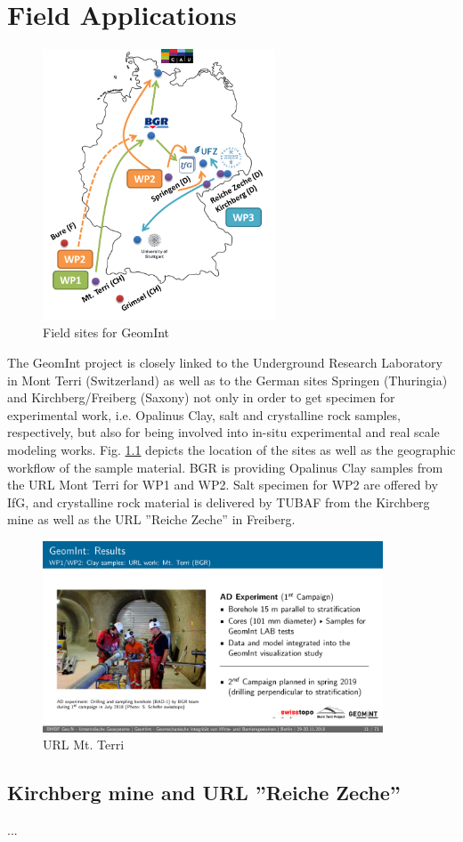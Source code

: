 \chapter{Field Applications}


\begin{figure}
\includegraphics[width=6.9cm]{figures/geomint-exp.png}
\caption{Field sites for GeomInt}
\label{fig:geomint-sites}
\end{figure}
The GeomInt project is closely linked to the Underground Research Laboratory in Mont Terri (Switzerland) as well as to the German sites Springen (Thuringia) and Kirchberg/Freiberg (Saxony) not only in order to get specimen for experimental work, i.e. Opalinus Clay, salt and crystalline rock samples, respectively, but also for being involved into in-situ experimental and real scale modeling works.
Fig. \ref{fig:geomint-sites} depicts the location of the sites as well as the geographic workflow of the sample material. BGR is providing Opalinus Clay samples from the URL Mont Terri for WP1 and WP2. Salt specimen for WP2 are offered by IfG, and crystalline rock material is delivered by TUBAF from the Kirchberg mine as well as the URL ''Reiche Zeche'' in Freiberg.

\begin{figure}
\includegraphics[width=0.9\textwidth]{figures/geomint-mt-terri.png}
\caption{URL Mt. Terri}
\label{fig:geomint-exp}
\end{figure}

\section{Kirchberg mine and URL ''Reiche Zeche''}

\begin{list}{-}{\leftmargin=1em \itemindent=0em \itemsep=0.2em}
\item ...
\end{list}
